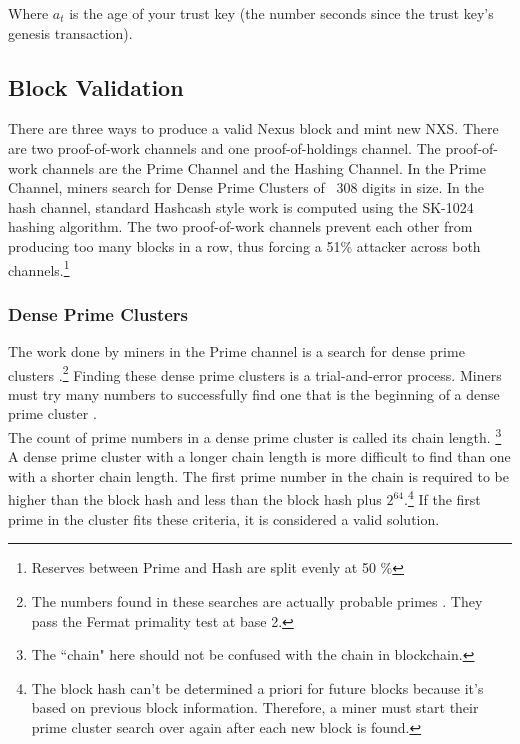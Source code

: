 \documentclass[11pt]{article}
\begin{document}
\noindent Where $a_t$ is the age of your trust key (the number seconds since the trust key's genesis transaction).

\subsection{Block Validation}

There are three ways to produce a valid Nexus block and mint new NXS.
There are two proof-of-work channels and one proof-of-holdings channel.
The proof-of-work channels are the Prime Channel and the Hashing Channel.
In the Prime Channel, miners search for Dense Prime Clusters of ~308 digits in size.
In the hash channel, standard Hashcash \cite{hashcash} style work is computed using the SK-1024 hashing algorithm. 
The two proof-of-work channels prevent each other from producing too many blocks in a row, thus forcing a 51\% attacker across both channels.\footnote{Reserves between Prime and Hash are split evenly at 50 \%}

\subsubsection{Dense Prime Clusters}

The work done by miners in the Prime channel is a search for dense prime clusters \cite{wikiprimecluster}.\footnote{The numbers found in these searches are actually probable primes \cite{wikiprobable}. They pass the Fermat primality test \cite{wikifermat} at base 2.}
Finding these dense prime clusters is a trial-and-error process.
Miners must try many numbers to successfully find one that is the beginning of a dense prime cluster \cite{wolframprimecluster,primesolominer}.\\ 

\noindent The count of prime numbers in a dense prime cluster is called its chain length.
\footnote{The ``chain" here should not be confused with the chain in blockchain.}
A dense prime cluster with a longer chain length is more difficult to find than one with a shorter chain length.
The first prime number in the chain is required to be higher than the block hash and less than the block hash plus $2^{64}$.\footnote{The block hash can't be determined a priori for future blocks because it's based on previous block information. 
Therefore, a miner must start their prime cluster search over again after each new block is found.}
If the first prime in the cluster fits these criteria, it is considered a valid solution.\\
\end{document}
